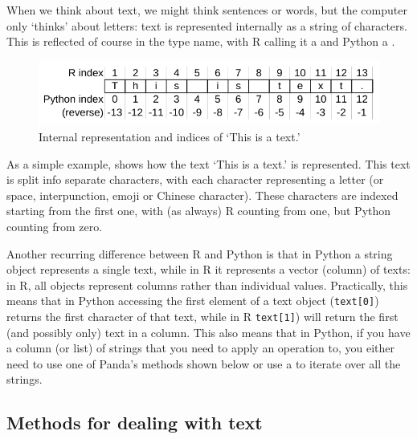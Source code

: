 When we think about text, we might think sentences or words, but the computer only `thinks' about letters:
text is represented internally as a string of characters.
This is reflected of course in the type name, with R calling it a  and Python a .

\begin{figure}
  \includegraphics[width=.5\textwidth]{chapter10/text.pdf}
  \caption{Internal representation and indices of `This is a text.'}\label{fig:text}
\end{figure}

As a simple example,  shows how the text `This is a text.' is represented.
This text is split info separate characters, with each character representing a letter (or space, interpunction, emoji or Chinese character).
These characters are indexed starting from the first one, with (as always) R counting from one, but Python counting from zero.

Another recurring difference between R and Python is that in Python a string object represents a single text, while in R it represents a vector (column) of texts: in R, all objects represent columns rather than individual values. 
Practically, this means that in Python accessing the first element of a text object (\verb|text[0]|) returns the first character of that text, while in R \verb|text[1]|) will return the first (and possibly only) text in a column.
This also means that in Python, if you have a column (or list) of strings that you need to apply an operation to,
you either need to use one of Panda's methods shown below or use a  to iterate over all the strings.

\subsection{Methods for dealing with text}

    
